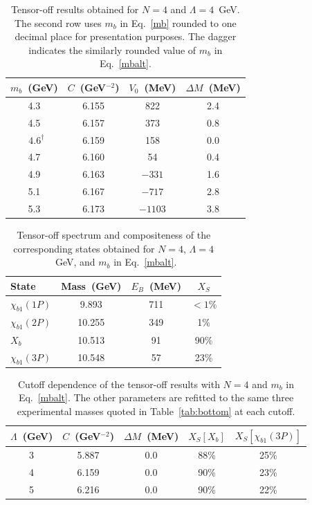 \documentclass[aps,prd,showpacs,amsmath,twocolumn,superscriptaddress,floatfix,nofootinbib,notitlepage]{revtex4-2}
\newcommand{\Xb}{X_b}
\newcommand{\unit}[1]{~(#1)}
\begin{document}
\begin{table}[tb]
\centering
\caption{Tensor-off results obtained for $N=4$ and $\Lambda=4$~GeV. The second row uses $m_b$ in Eq.~\eqref{mb} rounded to one decimal place for presentation purposes. The dagger indicates the similarly rounded value of $m_b$ in Eq.~\eqref{mbalt}.}
\label{tab:tensor-off-parameters} 
\begin{ruledtabular}
\begin{tabular}{cccc}
$m_b$\unit{GeV} & $C$\unit{GeV$^{-2}$} & $V_0$\unit{MeV} & $\Delta M$\unit{MeV} \\
\hline
4.3 & 6.155 & 822 & 2.4 \\
4.5 & 6.157 & 373 & 0.8 \\
~$4.6^\dagger$ & 6.159 & 158 & 0.0 \\
4.7 & 6.160 & 54 & 0.4 \\
4.9 & 6.163 & $-331$ & 1.6 \\
5.1 & 6.167 & $-717$ & 2.8 \\
5.3 & 6.173 & $-1103$ & 3.8
\end{tabular}
\end{ruledtabular}
\end{table}

\begin{table}[tb]
\centering
\caption{Tensor-off spectrum and compositeness of the corresponding states obtained for $N=4$, $\Lambda=4$~GeV, and $m_b$ in Eq.~\eqref{mbalt}.}
\label{tab:results-tensor-off}
\begin{ruledtabular}
\begin{tabular}{lccc}
State & Mass\unit{GeV} & $E_B$\unit{MeV} & $X_S$ \\
\hline
$\chi_{b1}(1P)$ & 9.893 & 711 & $<1\%$ \\
$\chi_{b1}(2P)$ & 10.255 & 349 & 1\% \\
$\Xb$& 10.513 & 91 & 90\% \\
$\chi_{b1}(3P)$ & 10.548 & 57 & 23\%
\end{tabular}
\end{ruledtabular}
\end{table}

\begin{table}[t!]
\centering
\caption{Cutoff dependence of the tensor-off results with $N=4$ and $m_b$ in Eq.~\eqref{mbalt}. The other parameters are refitted to the same three experimental masses quoted in Table~\ref{tab:bottom} at each cutoff.}
\label{tab:cutoff-tensor-off}
\begin{ruledtabular}
\setlength{\tabcolsep}{3pt}
\begin{tabular}{ccccc}
$\Lambda$\unit{GeV} & $C$\unit{GeV$^{-2}$} & $\Delta M$\unit{MeV}
& $X_S [\Xb]$ & $X_S[\chi_{b1}(3P)]$ \\
\hline
3 & 5.887 & 0.0 & 88\% & 25\% \\
4 & 6.159 & 0.0 & 90\% & 23\% \\
5 & 6.216 & 0.0 & 90\% & 22\%
\end{tabular}
\end{ruledtabular}
\end{table}
\end{document}
